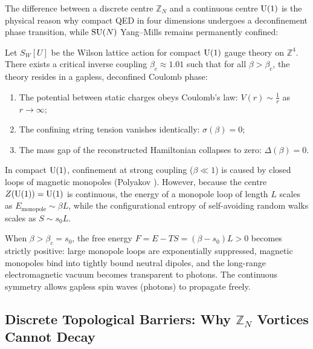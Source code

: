 The difference between a discrete centre $\mathbb{Z}_N$ and a continuous centre $\mathrm{U}(1)$ is the physical reason why compact QED in four dimensions undergoes a deconfinement phase transition, while $\mathrm{SU}(N)$ Yang--Mills remains permanently confined:

\begin{theorem}
\label{thm:guth_deconfinement}
Let $S_W[U]$ be the Wilson lattice action for compact $\mathrm{U}(1)$ gauge theory on $\mathbb{Z}^4$. There exists a critical inverse coupling $\beta_c \approx 1.01$ such that for all $\beta > \beta_c$, the theory resides in a gapless, deconfined Coulomb phase:
\begin{enumerate}
    \item The potential between static charges obeys Coulomb's law: $V(r) \sim \frac{1}{r}$ as $r \to \infty$;
    \item The confining string tension vanishes identically: $\sigma(\beta) = 0$;
    \item The mass gap of the reconstructed Hamiltonian collapses to zero: $\Delta(\beta) = 0$.
\end{enumerate}
\end{theorem}

In compact $\mathrm{U}(1)$, confinement at strong coupling ($\beta \ll 1$) is caused by closed loops of magnetic monopoles (Polyakov \cite{Polyakov1977}). However, because the centre $Z(\mathrm{U}(1)) = \mathrm{U}(1)$ is continuous, the energy of a monopole loop of length $L$ scales as $E_{\mathrm{monopole}} \sim \beta L$, while the configurational entropy of self-avoiding random walks scales as $S \sim s_0 L$. 

When $\beta > \beta_c = s_0$, the free energy $F = E - T S = (\beta - s_0) L > 0$ becomes strictly positive: large monopole loops are exponentially suppressed, magnetic monopoles bind into tightly bound neutral dipoles, and the long-range electromagnetic vacuum becomes transparent to photons. The continuous symmetry allows gapless spin waves (photons) to propagate freely.

\subsection{Discrete Topological Barriers: Why \texorpdfstring{$\mathbb{Z}_N$}{Z_N} Vortices Cannot Decay}
\label{subsec:zn_vortices_protection}

